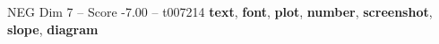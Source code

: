 \begin{textsample}{NEG Dim 7 – Score -7.00 – t007214}  \label{ex:f7_neg_025}
\textbf{text}, \textbf{font}, \textbf{plot}, \textbf{number}, \textbf{screenshot}, \textbf{slope}, \textbf{diagram}

\end{textsample}
